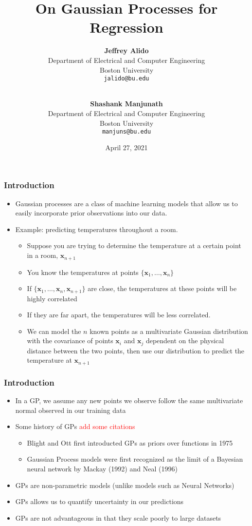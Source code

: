\documentclass[pdf]{beamer}
\title{On Gaussian Processes for Regression}
\author{
  \textbf{Jeffrey Alido} \\
  Department of Electrical and Computer Engineering \\
  Boston University \\
  \texttt{jalido@bu.edu} \\
  \and \\
  \textbf{Shashank Manjunath} \\
  Department of Electrical and Computer Engineering \\
  Boston University \\
  \texttt{manjuns@bu.edu}
}
\date{April 27, 2021}
\newcommand{\bx}{\boldsymbol{x}}
\newcommand{\todo}[1]{\textcolor{red}{#1}}
\begin{document}
\begin{frame}
  \titlepage
\end{frame}

\begin{frame}
  \frametitle{Introduction}

  \begin{itemize}
    \item Gaussian processes are a class of machine learning models that allow us to easily incorporate prior
      observations into our data. 
    \item Example: predicting temperatures throughout a room.
    \begin{itemize}
      \item Suppose you are trying to determine the temperature at a certain point in a room, $\bx_{n+1}$
      \item You know the temperatures at points $\{\bx_1, \hdots, \bx_n\}$
      \item If $\{\bx_1, \hdots, \bx_n, \bx_{n+1}\}$ are close, the temperatures at these points will be highly
        correlated
      \item If they are far apart, the temperatures will be less correlated.
      \item We can model the $n$ known points as a multivariate Gaussian distribution with the covariance of points
        $\bx_i$ and $\bx_j$ dependent on the physical distance between the two points, then use our distribution to
        predict the temperature at $\bx_{n+1}$
    \end{itemize}
  \end{itemize}
\end{frame}

\begin{frame}
  \frametitle{Introduction}
  \begin{itemize}
    \item In a GP, we assume any new points we observe follow the same multivariate normal observed in our training data
    \item Some history of GPs 
    	\cite{rasmussen_gaussian_2006}
      \todo{add some citations}
    \begin{itemize}
      \item Blight and Ott first introducted GPs as priors over functions in 1975
      \item Gaussian Process models were first recognized as the limit of a Bayesian neural network by Mackay (1992) and
        Neal (1996)
    \end{itemize}
    \item GPs are non-parametric models (unlike models such as Neural Networks)
    \item GPs allows us to quantify uncertainty in our predictions
    \item GPs are not advantageous in that they scale poorly to large datasets
  \end{itemize}
\end{frame}
\end{document}
